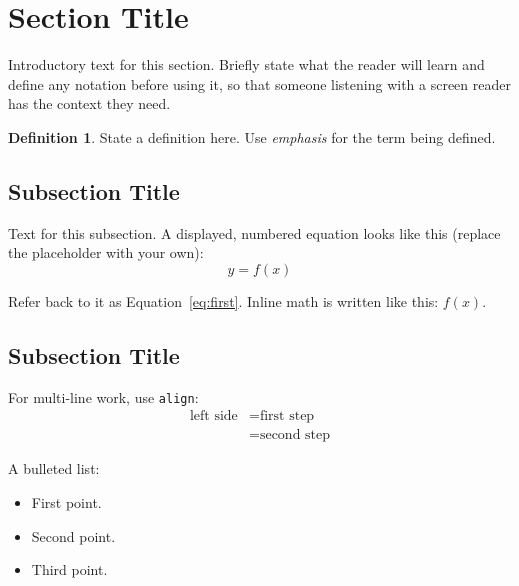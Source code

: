 \documentclass[12pt]{article}
\title{\HandoutTitle}
\author{\HandoutAuthor\\ \HandoutCourse}
\date{\HandoutDate}
\theoremstyle{definition}
\newtheorem{definition}{Definition}[section]
\theoremstyle{plain}
\begin{document}
\maketitle

\section{Section Title}

Introductory text for this section. Briefly state what the reader will
learn and define any notation before using it, so that someone
listening with a screen reader has the context they need.

\begin{definition}
  State a definition here. Use \emph{emphasis} for the term being
  defined.
\end{definition}

\subsection{Subsection Title}

Text for this subsection. A displayed, numbered equation looks like
this (replace the placeholder with your own):
\begin{equation}\label{eq:first}
  y = f(x)
\end{equation}

Refer back to it as Equation~\eqref{eq:first}. Inline math is written
like this: \(f(x)\).

\subsection{Subsection Title}

For multi-line work, use \texttt{align}:
\begin{align}
  \text{left side} &= \text{first step} \label{eq:step1} \\
                   &= \text{second step} \label{eq:step2}
\end{align}

A bulleted list:
\begin{itemize}
  \item First point.
  \item Second point.
  \item Third point.
\end{itemize}
\end{document}
